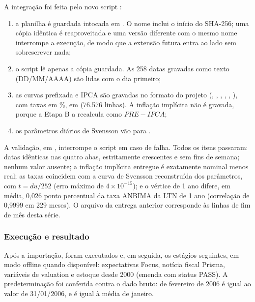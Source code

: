 \documentclass[12pt,a4paper]{article}
\begin{document}
A integração foi feita pelo novo script :
\begin{enumerate}[leftmargin=1.2cm]
    \item a planilha é guardada intocada em
    . O nome
    inclui o início do SHA-256; uma cópia idêntica é reaproveitada e uma versão
    diferente com o mesmo nome interrompe a execução, de modo que a extensão futura
    entra ao lado sem sobrescrever nada;
    \item o script lê apenas a cópia guardada. As 258 datas gravadas como texto
    (DD/MM/AAAA) são lidas com o dia primeiro;
    \item as curvas prefixada e IPCA são gravadas no formato do projeto (,
    , , ,
    , ), com taxas em \%, em
     (76.576 linhas). A inflação
    implícita não é gravada, porque a Etapa B a recalcula como \(PRE - IPCA\);
    \item os parâmetros diários de Svensson vão para
    .
\end{enumerate}

A validação, em ,
interrompe o script em caso de falha. Todos os itens passaram: datas idênticas nas
quatro abas, estritamente crescentes e sem fins de semana; nenhum valor ausente; a
inflação implícita entregue é exatamente nominal menos real; as taxas coincidem com
a curva de Svensson reconstruída dos parâmetros, com \(t = du/252\) (erro máximo de
\(4\times10^{-15}\)); e o vértice de 1 ano difere, em média, 0,026 ponto percentual
da taxa ANBIMA da LTN de 1 ano (correlação de 0,9999 em 229 meses). O arquivo
 da entrega anterior corresponde às linhas de fim de
mês desta série.

\subsubsection{Execução e resultado}

Após a importação, foram executados 
e, em seguida, os estágios seguintes, em modo offline quando disponível:
expectativas Focus, notícia fiscal Prisma, variáveis de valuation e estoque desde
2000 (emenda com status PASS). A predeterminação foi conferida contra o dado bruto:
 de fevereiro de 2006 é igual ao valor de 31/01/2006, e
 é igual à média de janeiro.
\end{document}
